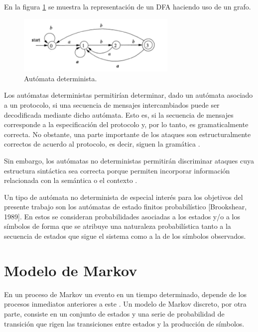 En la figura \ref{fig:DFA} se muestra la representación de un DFA haciendo uso de un grafo.

\begin{figure}[tb]
\begin{center}
\includegraphics[width=3in]{./img/DFA.png}
\caption{Autómata determinista.\cite{automataFinito}}
\label{fig:DFA}
\end{center}
\end{figure}

Los autómatas deterministas permitirían determinar, dado un autómata asociado a un protocolo, si una secuencia de mensajes intercambiados puede ser decodificada mediante dicho autómata. Esto es, si la secuencia de mensajes corresponde a la especificación del protocolo y, por lo tanto, es gramaticalmente correcta. No obstante, una parte importante de los ataques son estructuralmente correctos de acuerdo al protocolo, es decir, siguen la gramática \cite{tesisMexico}.

Sin embargo, los autómatas no deterministas permitirán discriminar ataques cuya estructura sintáctica sea correcta porque permiten incorporar información relacionada con la semántica o el contexto .

Un tipo de autómata no determinista de especial interés para los objetivos del presente trabajo son los autómatas de estado finitos probabilístico [Brookshear, 1989]. En estos se consideran probabilidades asociadas a los estados y/o a los símbolos de forma que se atribuye una naturaleza probabilística tanto a la secuencia de estados que sigue el sistema como a la de los símbolos observados.


\section{Modelo de Markov}

En un proceso de Markov un evento en un tiempo determinado, depende de los procesos inmediatos anteriores a este \cite{markov}. Un modelo de Markov discreto, por otra parte, consiste en un conjunto de estados y una serie de probabilidad de transición que rigen las transiciones entre estados y la producción de símbolos.

